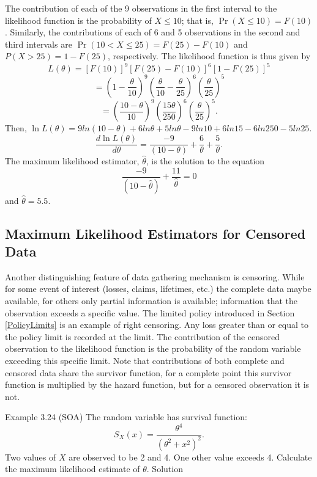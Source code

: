 \documentclass[]{book}
\begin{document}
The contribution of each of the 9 observations in the first interval to
the likelihood function is the probability of \(X \leq 10\); that is,
\(\Pr\left( X \leq 10 \right) = F\left( 10 \right)\). Similarly, the
contributions of each of 6 and 5 observations in the second and third
intervals are
\(\Pr\left( 10 < X \leq 25 \right) = F\left( 25 \right) - F(10)\) and
\(P\left( X > 25 \right) = 1 - F(25)\), respectively. The likelihood
function is thus given by
\[L\left( \theta \right) = \left\lbrack F\left( 10 \right) \right\rbrack^{9}\left\lbrack F\left( 25 \right) - F(10) \right\rbrack^{6}\left\lbrack 1 - F(25) \right\rbrack^{5}\]
\[{= \left( 1 - \frac{\theta}{10} \right)}^{9}\left( \frac{\theta}{10} - \frac{\theta}{25} \right)^{6}\left( \frac{\theta}{25} \right)^{5}\]
\[{= \left( \frac{10 - \theta}{10} \right)}^{9}\left( \frac{15\theta}{250} \right)^{6}\left( \frac{\theta}{25} \right)^{5}.\]
Then,
\(\ln L \left( \theta \right) = 9ln\left( 10 - \theta \right) + 6ln\theta + 5ln\theta - 9ln10 + 6ln15 - 6ln250 - 5ln25\).
\[\frac{d \ln L \left( \theta \right)}{d \theta} = \frac{- 9}{\left( 10 - \theta \right)} + \frac{6}{\theta} + \frac{5}{\theta}.\]
The maximum likelihood estimator, \(\hat{\theta}\), is the solution to
the equation
\[\frac{- 9}{\left( 10 - \hat{\theta} \right)} + \frac{11}{\hat{\theta}} = 0\]
and \(\hat{\theta} = 5.5\).

\subsection{Maximum Likelihood Estimators for Censored
Data}\label{maximum-likelihood-estimators-for-censored-data}

Another distinguishing feature of data gathering mechanism is censoring.
While for some event of interest (losses, claims, lifetimes, etc.) the
complete data maybe available, for others only partial information is
available; information that the observation exceeds a specific value.
The limited policy introduced in Section \ref{PolicyLimits} is an
example of right censoring. Any loss greater than or equal to the policy
limit is recorded at the limit. The contribution of the censored
observation to the likelihood function is the probability of the random
variable exceeding this specific limit. Note that contributions of both
complete and censored data share the survivor function, for a complete
point this survivor function is multiplied by the hazard function, but
for a censored observation it is not.

Example 3.24 (SOA) The random variable has survival function:
\[S_{X}\left( x \right) = \frac{\theta^{4}}{\left( \theta^{2} + x^{2} \right)^{2}}.\]
Two values of \(X\) are observed to be 2 and 4. One other value exceeds
4. Calculate the maximum likelihood estimate of \(\theta\). Solution
\end{document}
